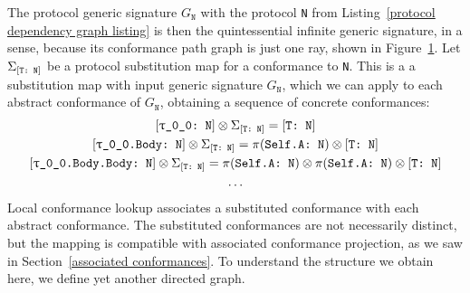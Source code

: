\documentclass[../generics]{subfiles}
\begin{document}
\begin{figure}\label{ray conformance path graph}
\begin{center}
\end{center}
\end{figure}

The protocol generic signature $G_\texttt{N}$ with the protocol \texttt{N} from Listing~\ref{protocol dependency graph listing} is then the quintessential infinite generic signature, in a sense, because its conformance path graph is just one ray, shown in Figure~\ref{ray conformance path graph}. Let $\Sigma_{[\texttt{T:~N}]}$ be a protocol substitution map for a conformance to \texttt{N}. This is a a substitution map with input generic signature $G_\texttt{N}$, which we can apply to each abstract conformance of $G_\texttt{N}$, obtaining a sequence of concrete conformances:
\begin{gather*}
\ConfReq{\ttgp{0}{0}}{N}\otimes\Sigma_{\ConfReq{T}{N}}=\ConfReq{T}{N}\\
\ConfReq{\ttgp{0}{0}.Body}{N}\otimes\Sigma_{\ConfReq{T}{N}}=\SelfAToN\otimes\ConfReq{T}{N}\\
\ConfReq{\ttgp{0}{0}.Body.Body}{N}\otimes\Sigma_{\ConfReq{T}{N}}=\SelfAToN\otimes\SelfAToN\otimes\ConfReq{T}{N}\\
\ldots
\end{gather*}
Local conformance lookup associates a substituted conformance with each abstract conformance. The substituted conformances are not necessarily distinct, but the mapping is compatible with associated conformance projection, as we saw in Section~\ref{associated conformances}. To understand the structure we obtain here, we define yet another directed graph.
\end{document}
